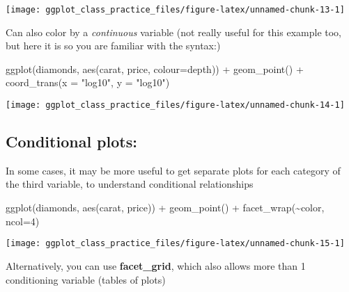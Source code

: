 \documentclass[
]{article}
\newenvironment{Shaded}{\begin{snugshade}}{\end{snugshade}}
\newcommand{\AttributeTok}[1]{\textcolor[rgb]{0.77,0.63,0.00}{#1}}
\newcommand{\DecValTok}[1]{\textcolor[rgb]{0.00,0.00,0.81}{#1}}
\newcommand{\FunctionTok}[1]{\textcolor[rgb]{0.00,0.00,0.00}{#1}}
\newcommand{\NormalTok}[1]{#1}
\newcommand{\SpecialCharTok}[1]{\textcolor[rgb]{0.00,0.00,0.00}{#1}}
\newcommand{\StringTok}[1]{\textcolor[rgb]{0.31,0.60,0.02}{#1}}
\begin{document}
\begin{center}\texttt{[image: ggplot\_class\_practice\_files/figure-latex/unnamed-chunk-13-1]} \end{center}

Can also color by a \emph{continuous} variable (not really useful for
this example too, but here it is so you are familiar with the syntax:)

\begin{Shaded}
\begin{Highlighting}[]
\FunctionTok{ggplot}\NormalTok{(diamonds, }\FunctionTok{aes}\NormalTok{(carat, price, }\AttributeTok{colour=}\NormalTok{depth)) }\SpecialCharTok{+} \FunctionTok{geom\_point}\NormalTok{() }\SpecialCharTok{+} 
    \FunctionTok{coord\_trans}\NormalTok{(}\AttributeTok{x =} \StringTok{"log10"}\NormalTok{, }\AttributeTok{y =} \StringTok{"log10"}\NormalTok{)}
\end{Highlighting}
\end{Shaded}

\begin{center}\texttt{[image: ggplot\_class\_practice\_files/figure-latex/unnamed-chunk-14-1]} \end{center}

\hypertarget{conditional-plots}{%
\subsection{Conditional plots:}\label{conditional-plots}}

In some cases, it may be more useful to get separate plots for each
category of the third variable, to understand conditional relationships

\begin{Shaded}
\begin{Highlighting}[]
\FunctionTok{ggplot}\NormalTok{(diamonds, }\FunctionTok{aes}\NormalTok{(carat, price)) }\SpecialCharTok{+} \FunctionTok{geom\_point}\NormalTok{() }\SpecialCharTok{+}
  \FunctionTok{facet\_wrap}\NormalTok{(}\SpecialCharTok{\textasciitilde{}}\NormalTok{color, }\AttributeTok{ncol=}\DecValTok{4}\NormalTok{)}
\end{Highlighting}
\end{Shaded}

\begin{center}\texttt{[image: ggplot\_class\_practice\_files/figure-latex/unnamed-chunk-15-1]} \end{center}

Alternatively, you can use \textbf{facet\_grid}, which also allows more
than 1 conditioning variable (tables of plots)
\end{document}
